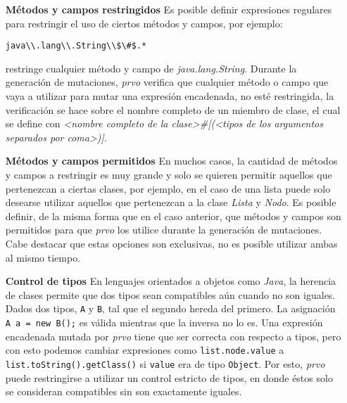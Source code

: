 \begin{enumerate}[leftmargin=.75cm,align=left]
	\item[\textbf{M\'etodos y campos restringidos}] Es posible definir expresiones regulares para restringir el uso de ciertos m\'etodos y campos, por ejemplo:
	\begin{lstlisting}[mathescape=true]
	java\\.lang\\.String\\$\#$.*
	\end{lstlisting}
	restringe cualquier m\'etodo y campo de \emph{java.lang.String}. Durante la generaci\'on de mutaciones, \emph{prvo} verifica que cualquier m\'etodo o campo que vaya a utilizar para mutar una expresi\'on encadenada, no est\'e restringida, la verificaci\'on se hace sobre el nombre completo de un miembro de clase, el cual se define con \emph{<nombre completo de la clase>\#<nombre del miembro>[(<tipos de los argumentos separados por coma>)]}.
	
	\item[\textbf{M\'etodos y campos permitidos}] En muchos casos, la cantidad de m\'etodos y campos a restringir es muy grande y solo se quieren permitir aquellos que pertenezcan a ciertas clases, por ejemplo, en el caso de una lista puede solo desearse utilizar aquellos que pertenezcan a la clase \emph{Lista} y \emph{Nodo}. Es posible definir, de la misma forma que en el caso anterior, que m\'etodos y campos son permitidos para que \emph{prvo} los utilice durante la generaci\'on de mutaciones. Cabe destacar que estas opciones son exclusivas, no es posible utilizar ambas al mismo tiempo.
	
	\item[\textbf{Control de tipos}] En lenguajes orientados a objetos como \emph{Java}, la herencia de clases permite que dos tipos sean compatibles a\'un cuando no son iguales. Dados dos tipos, \texttt{A} y \texttt{B}, tal que el segundo hereda del primero. La asignaci\'on \lstinline|A a = new B();| es v\'alida mientras que la inversa no lo es. Una expresi\'on encadenada mutada por \emph{prvo} tiene que ser correcta con respecto a tipos, pero con esto podemos cambiar expresiones como \lstinline|list.node.value| a \lstinline|list.toString().getClass()| si \texttt{value} era de tipo \texttt{Object}. Por esto, \emph{prvo} puede restringirse a utilizar un control estricto de tipos, en donde \'estos solo se consideran compatibles sin son exactamente iguales.
	

\end{enumerate}
